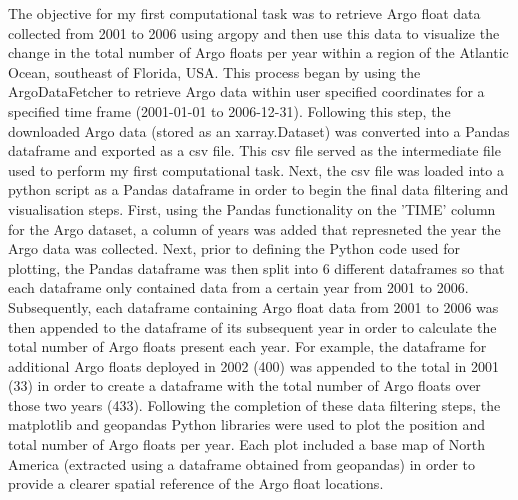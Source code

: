 \documentclass{article}
\begin{document}
The objective for my first computational task was to retrieve Argo float data collected from 2001 to 2006 using argopy and then use this data to visualize the change in the total number of Argo floats per year within a region of the Atlantic Ocean, southeast of Florida, USA. This process began by using the ArgoDataFetcher to retrieve Argo data within user specified coordinates for a specified time frame (2001-01-01 to 2006-12-31). Following this step, the downloaded Argo data (stored as an xarray.Dataset) was converted into a Pandas dataframe and exported as a csv file. This csv file served as the intermediate file used to perform my first computational task. Next, the csv file was loaded into a python script as a Pandas dataframe in order to begin the final data filtering and visualisation steps. First, using the Pandas functionality on the 'TIME' column for the Argo dataset, a column of years was added that represneted the year the Argo data was collected. Next, prior to defining the Python code used for plotting, the Pandas dataframe was then split into 6 different dataframes so that each dataframe only contained data from a certain year from 2001 to 2006. Subsequently, each dataframe containing Argo float data from 2001 to 2006 was then appended to the dataframe of its subsequent year in order to calculate the total number of Argo floats present each year. For example, the dataframe for additional Argo floats deployed in 2002 (400) was appended to the total in 2001 (33) in order to create a dataframe with the total number of Argo floats over those two years (433). Following the completion of these data filtering steps, the matplotlib and geopandas Python libraries were used to plot the position and total number of Argo floats per year. Each plot included a base map of North America (extracted using a dataframe obtained from geopandas) in order to provide a clearer spatial reference of the Argo float locations.
\end{document}
